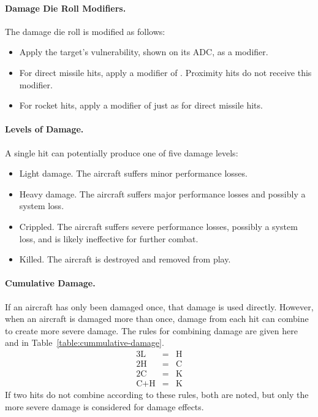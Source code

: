 {\paragraph{Damage Die Roll Modifiers.} The damage die roll is modified as follows:

\begin{itemize}

    \item Apply the target's vulnerability, shown on its ADC, as a modifier.
    
    \item For direct missile hits, apply a modifier of . Proximity hits do not receive this modifier.    
    
    \item For rocket hits, apply a modifier of  just as for direct missile hits.
    
\end{itemize}

\paragraph{Levels of Damage.} A single hit can potentially produce one of five damage levels:

\begin{itemize}

    \item{} Light damage. The aircraft suffers minor performance losses.

    \item{} Heavy damage. The aircraft suffers major performance losses and possibly a system loss.

    \item{} Crippled. The aircraft suffers severe performance losses, possibly a system loss, and is likely ineffective for further combat.
    
    \item{} Killed. The aircraft is destroyed and removed from play.

\end{itemize}



\paragraph{Cumulative Damage.} 
If an aircraft has only been damaged once, that damage is used directly. However, when an aircraft is damaged more than once,
damage from each hit can combine to create more severe damage. The rules for combining damage are given here and in Table~\ref{table:cummulative-damage}.
\begin{eqnarray*}
3\textrm{L}&=&\textrm{H}\\
2\textrm{H}&=&\textrm{C}\\
2\textrm{C}&=&\textrm{K}\\
\textrm{C} + \textrm{H}&=&\textrm{K}
\end{eqnarray*}
If two hits do not combine according to these rules, both are noted, but only the more severe damage is considered for damage effects.

}
